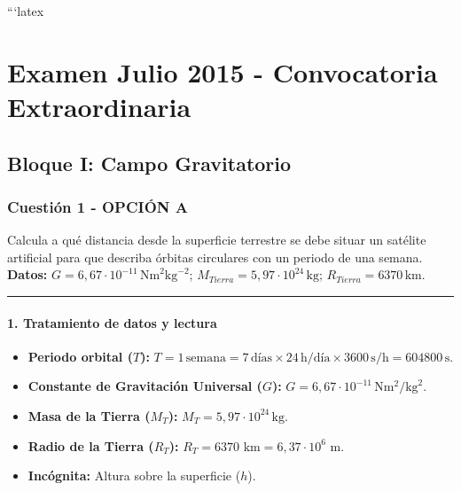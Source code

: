```latex
\chapter{Examen Julio 2015 - Convocatoria Extraordinaria}
\label{chap:2015_jul_ext}

\section{Bloque I: Campo Gravitatorio}
\label{sec:grav_2015_jul_ext}

\subsection{Cuestión 1 - OPCIÓN A}
\label{subsec:1A_2015_jul_ext}

\begin{cajaenunciado}
Calcula a qué distancia desde la superficie terrestre se debe situar un satélite artificial para que describa órbitas circulares con un periodo de una semana.
\textbf{Datos:} $G=6,67\cdot10^{-11}\,\text{Nm}^{2}\text{kg}^{-2}$; $M_{Tierra}=5,97\cdot10^{24}\,\text{kg}$; $R_{Tierra}=6370\,\text{km}$.
\end{cajaenunciado}
\hrule

\subsubsection*{1. Tratamiento de datos y lectura}
\begin{itemize}
    \item \textbf{Periodo orbital ($T$):} $T = 1\,\text{semana} = 7\,\text{días} \times 24\,\text{h/día} \times 3600\,\text{s/h} = 604800\,\text{s}$.
    \item \textbf{Constante de Gravitación Universal ($G$):} $G = 6,67 \cdot 10^{-11} \, \text{N}\text{m}^2/\text{kg}^2$.
    \item \textbf{Masa de la Tierra ($M_T$):} $M_T = 5,97 \cdot 10^{24} \, \text{kg}$.
    \item \textbf{Radio de la Tierra ($R_T$):} $R_T = 6370 \text{ km} = 6,37 \cdot 10^6 \text{ m}$.
    \item \textbf{Incógnita:} Altura sobre la superficie ($h$).
\end{itemize}

